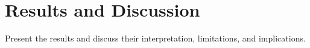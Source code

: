 \section{Results and Discussion}
\label{sec:results-discussion}

Present the results and discuss their interpretation, limitations, and implications.
